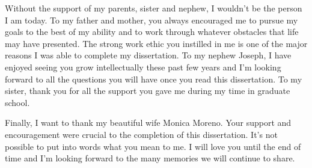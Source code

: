 \documentclass[12pt]{ucthesis}
\begin{document}
\begin{frontmatter}
\begin{acknowledgements}
        Without the support of my parents, sister and nephew, I wouldn't be the person I am today.
        To my father and mother, you always encouraged me to pursue my goals 
        to the best of my ability and to work through whatever obstacles that
        life may have presented.  The strong work ethic you instilled 
        in me is one of the major reasons I was able to complete my dissertation.
        To my nephew Joseph, I have enjoyed seeing you grow intellectually these
        past few years and I'm looking forward to all the questions you will have
        once you read this dissertation. To my sister, thank you for all the support 
        you gave me during my time in graduate school.

        Finally, I want to thank my beautiful wife Monica Moreno.  Your support
        and encouragement were crucial to the completion of this dissertation.
        It's not possible to put into words what you mean to me.  I will love
        you until the end of time and I'm looking forward to the many memories 
        we will continue to share.

    \end{acknowledgements}

\end{frontmatter}

















\linespread{1}\selectfont


\end{document}
